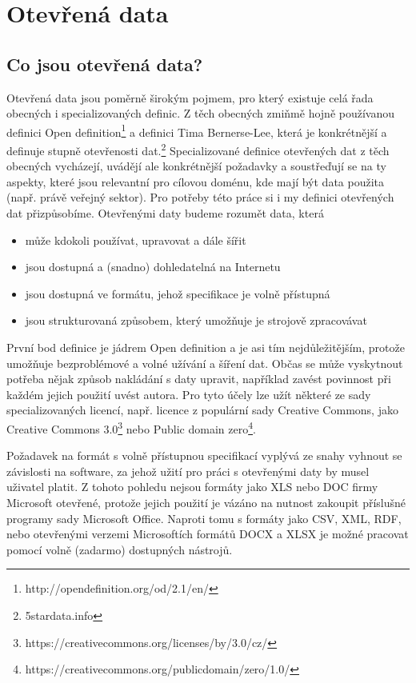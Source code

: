 \chapter{Otevřená data}
\section{Co jsou otevřená data?}
Otevřená data jsou poměrně širokým pojmem, pro který existuje celá řada obecných i specializovaných definic. Z těch obecných zmiňmě hojně používanou definici Open definition\footnote{http://opendefinition.org/od/2.1/en/} a definici Tima Bernerse-Lee, která je konkrétnější a definuje stupně otevřenosti dat.\footnote{5stardata.info} Specializované definice otevřených dat z těch obecných vycházejí, uvádějí ale konkrétnější požadavky a soustřeďují se na ty aspekty, které jsou relevantní pro cílovou doménu, kde mají být data použita (např. právě veřejný sektor). Pro potřeby této práce si i my definici otevřených dat přizpůsobíme. Otevřenými daty budeme rozumět data, která
\begin{itemize}
	\item může kdokoli používat, upravovat a dále šířit
	\item jsou dostupná a (snadno) dohledatelná na Internetu
	\item jsou dostupná ve formátu, jehož specifikace je volně přístupná
	\item jsou strukturovaná způsobem, který umožňuje je strojově zpracovávat
\end{itemize}

První bod definice je jádrem Open definition a je asi tím nejdůležitějším, protože umožňuje bezproblémové a volné užívání a šíření dat. Občas se může vyskytnout potřeba nějak způsob nakládání s daty upravit, například zavést povinnost při každém jejich použití uvést autora. Pro tyto účely lze užít některé ze sady specializovaných licencí, např. licence z populární sady Creative Commons, jako Creative Commons 3.0\footnote{https://creativecommons.org/licenses/by/3.0/cz/} nebo Public domain zero\footnote{https://creativecommons.org/publicdomain/zero/1.0/}.

Požadavek na formát s volně přístupnou specifikací vyplývá ze snahy vyhnout se závislosti na software, za jehož užití pro práci s otevřenými daty by musel uživatel platit. Z tohoto pohledu nejsou formáty jako XLS nebo DOC firmy Microsoft otevřené, protože jejich použití je vázáno na nutnost zakoupit příslušné programy sady Microsoft Office. Naproti tomu s formáty jako CSV, XML, RDF, nebo otevřenými verzemi Microsoftích formátů DOCX a XLSX je možné pracovat pomocí volně (zadarmo) dostupných nástrojů.

